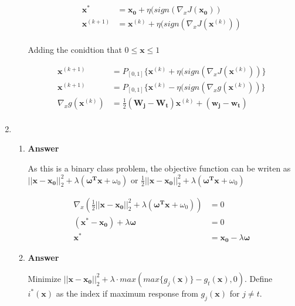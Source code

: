 \documentclass[11pt]{article}
\begin{document}
\begin{enumerate}[label=(\alph*)]
\begin{enumerate}[label=(\roman*)]
\begin{align*}
\mathbf{x^*} &= \mathbf{x_0} + \eta (sign({\nabla_x J(  \mathbf{x_0})}) \\
\mathbf{x}^{(k+1)} &= \mathbf{x}^{(k)} + \eta (sign({\nabla_x J(  \mathbf{x}^{(k)})}) \\
\end{align*}

Adding the conidtion that $0 \leq \mathbf{x} \leq 1$

\begin{align*}
\mathbf{x}^{(k+1)} &= P_{[0,1]}\{\mathbf{x}^{(k)} + \eta (sign({\nabla_x J(  \mathbf{x}^{(k)})})\} \\
\mathbf{x}^{(k+1)} &= P_{[0,1]}\{\mathbf{x}^{(k)} - \eta (sign({\nabla_x g(  \mathbf{x}^{(k)})})\} \\
\nabla_x g(\mathbf{x}^{(k)}) &= \frac{1}{2}(\mathbf{W_j}-\mathbf{W_t})\mathbf{x}^{(k)} + (\mathbf{w_j}-\mathbf{w_t}) \\
\end{align*}

\end{enumerate}


\item

\begin{enumerate}[label=(\roman*)]

\item \noindent\textbf{Answer}

As this is a binary class problem, the objective function can be writen as $||\mathbf{x}-\mathbf{x_0}||_2^2+\lambda(\boldsymbol{\omega^T}\mathbf{x} + \omega_0)$ or $\frac{1}{2}||\mathbf{x}-\mathbf{x_0}||_2^2+\lambda(\boldsymbol{\omega^T}\mathbf{x} + \omega_0)$

\begin{align*}
\nabla_x(\frac{1}{2}||\mathbf{x}-\mathbf{x_0}||_2^2+\lambda(\boldsymbol{\omega^T}\mathbf{x} + \omega_0)) &= 0\\
(\mathbf{x^*}-\mathbf{x_0}) + \lambda\boldsymbol{\omega} &= 0 \\
\mathbf{x^*} &= \mathbf{x_0} - \lambda\boldsymbol{\omega}
\end{align*}

\item \noindent\textbf{Answer}

Minimize $||\mathbf{x}-\mathbf{x_0}||_2^2 + \lambda \cdot max(max\{g_j(\mathbf{x})\}-g_t(\mathbf{x}),0)$. Define $i^*(\mathbf{x})$ as the index if maximum response from $g_j(\mathbf{x})$ for $j \neq t$. 


\end{enumerate}
\end{enumerate}
\end{document}
